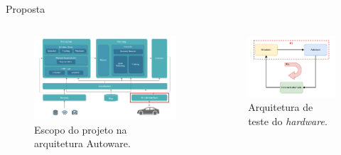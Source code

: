 \documentclass{if-beamer}
\begin{document}
\begin{frame}{Proposta}
	
	\begin{columns}
		
		\begin{column}{0.7\textwidth}
			
				\begin{figure}[H]
				\centering
				\includegraphics[width=\linewidth]{img/architecture.png}
				\caption{Escopo do projeto na arquitetura Autoware.}
				\label{fig:architecture}
			\end{figure}
			
		\end{column}
		
		\hspace{-0.5cm}
		
		\begin{column}{0.5\textwidth}
			
				\begin{figure}[H]
				\centering
				\includegraphics[width=\linewidth]{img/architecture_HIL}
				\caption{Arquitetura de teste do \textit{hardware}.}
				\label{fig:architecture_HIL}
			\end{figure}
			
		\end{column}
		
	\end{columns}
	
\end{frame}
\end{document}
